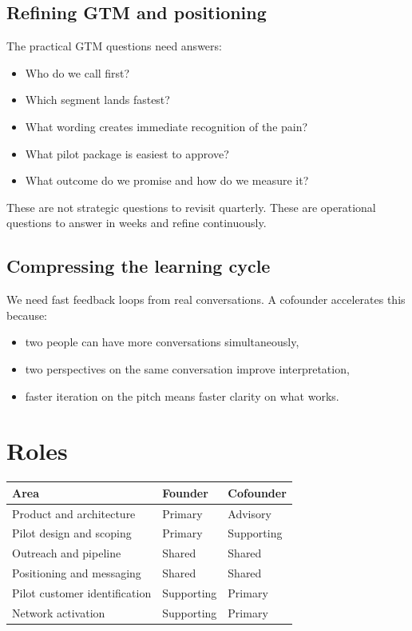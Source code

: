 \subsection{Refining GTM and positioning}

The practical GTM questions need answers:

\begin{itemize}
  \item Who do we call first?
  \item Which segment lands fastest?
  \item What wording creates immediate recognition of the pain?
  \item What pilot package is easiest to approve?
  \item What outcome do we promise and how do we measure it?
\end{itemize}

These are not strategic questions to revisit quarterly.
These are operational questions to answer in weeks and refine continuously.

\subsection{Compressing the learning cycle}

We need fast feedback loops from real conversations.
A cofounder accelerates this because:

\begin{itemize}
  \item two people can have more conversations simultaneously,
  \item two perspectives on the same conversation improve interpretation,
  \item faster iteration on the pitch means faster clarity on what works.
\end{itemize}

\section{Roles}

\begin{center}
\renewcommand{\arraystretch}{1.6}
\begin{tabularx}{0.92\textwidth}{@{}lXX@{}}
\toprule
\textbf{Area} & \textbf{Founder} & \textbf{Cofounder} \\
\midrule
Product and architecture & Primary & Advisory \\
Pilot design and scoping & Primary & Supporting \\
Outreach and pipeline & Shared & Shared \\
Positioning and messaging & Shared & Shared \\
Pilot customer identification & Supporting & Primary \\
Network activation & Supporting & Primary \\
\bottomrule
\end{tabularx}
\end{center}

